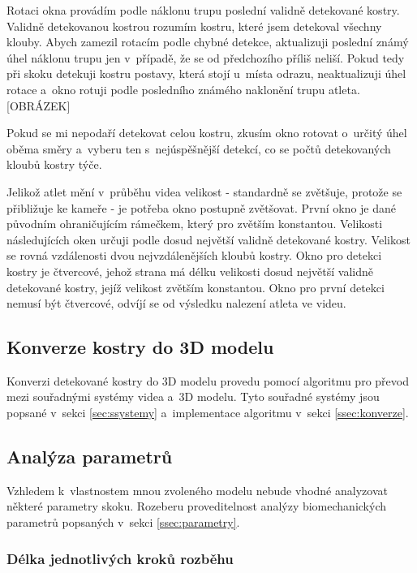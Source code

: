 Rotaci okna provádím podle náklonu trupu poslední validně detekované kostry. Validně detekovanou kostrou rozumím kostru, které jsem detekoval všechny klouby. Abych zamezil rotacím podle chybné detekce, aktualizuji poslední známý úhel náklonu trupu jen v~případě, že se od předchozího příliš neliší. Pokud tedy při skoku detekuji kostru postavy, která stojí u~místa odrazu, neaktualizuji úhel rotace a~okno rotuji podle posledního známého naklonění trupu atleta. [OBRÁZEK]

Pokud se mi nepodaří detekovat celou kostru, zkusím okno rotovat o~určitý úhel oběma směry a~vyberu ten s~nejúspěšnější detekcí, co se počtů detekovaných kloubů kostry týče.

Jelikož atlet mění v~průběhu videa velikost - standardně se zvětšuje, protože se přibližuje ke kameře - je potřeba okno postupně zvětšovat. První okno je dané původním ohraničujícím rámečkem, který pro zvětším konstantou. Velikosti následujících oken určuji podle dosud největší validně detekované kostry. Velikost se rovná vzdálenosti dvou nejvzdálenějších kloubů kostry. Okno pro detekci kostry je čtvercové, jehož strana má délku velikosti dosud největší validně detekované kostry, jejíž velikost zvětším konstantou. Okno pro první detekci nemusí být čtvercové, odvíjí se od výsledku nalezení atleta ve videu.



\subsection{Konverze kostry do 3D modelu}

Konverzi detekované kostry do 3D modelu provedu pomocí algoritmu pro převod mezi souřadnými systémy videa a~3D modelu. Tyto souřadné systémy jsou popsané v~sekci \ref{sec:ssystemy} a~implementace algoritmu v~sekci \ref{ssec:konverze}.



\subsection{Analýza parametrů}

Vzhledem k~vlastnostem mnou zvoleného modelu nebude vhodné analyzovat některé parametry skoku. Rozeberu proveditelnost analýzy biomechanických parametrů popsaných v~sekci \ref{ssec:parametry}.


\subsubsection{Délka jednotlivých kroků rozběhu}

